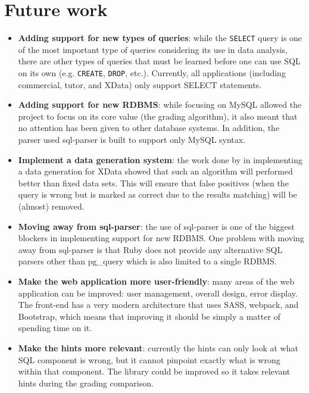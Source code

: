 \section{Future work}
\begin{itemize}
    \item \textbf{Adding support for new types of queries}: while the \texttt{SELECT} query is one of the most important type of queries considering its use in data analysis, there are other types of queries that must be learned before one can use SQL on its own (e.g. \texttt{CREATE}, \texttt{DROP}, etc.). Currently, all applications (including commercial, tutor, and XData) only support SELECT statements.
    \item \textbf{Adding support for new RDBMS}: while focusing on MySQL allowed the project to focus on its core value (the grading algorithm), it also meant that no attention has been given to other database systems. In addition, the parser used sql-parser is built to support only MySQL syntax.
    \item \textbf{Implement a data generation system}: the work done by \citet{lit:xdata_d} in implementing a data generation for XData showed that such an algorithm will performed better than fixed data sets. This will ensure that false positives (when the query is wrong but is marked as correct due to the results matching) will be (almost) removed.
    \item \textbf{Moving away from sql-parser}: the use of sql-parser is one of the biggest blockers in implementing support for new RDBMS. One problem with moving away from sql-parser is that Ruby does not provide any alternative SQL parsers other than pg\_query which is also limited to a single RDBMS.
    \item \textbf{Make the web application more user-friendly}: many areas of the web application can be improved: user management, overall design, error display. The front-end has a very modern architecture that uses SASS, webpack, and Bootstrap, which means that improving it should be simply a matter of spending time on it.
    \item \textbf{Make the hints more relevant}: currently the hints can only look at what SQL component is wrong, but it cannot pinpoint exactly what is wrong within that component. The library could be improved so it takes relevant hints during the grading comparison.
\end{itemize}